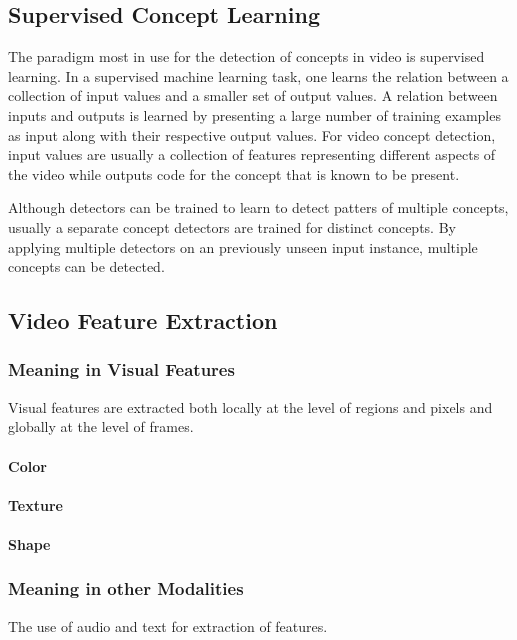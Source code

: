 \subsection{Supervised Concept Learning}

The paradigm most in use for the detection of concepts in video is supervised learning. In a supervised machine learning task, one learns the relation between a collection of input values and a smaller set of output values. A relation between inputs and outputs is learned by presenting a large number of training examples as input along with their respective output values. For video concept detection, input values are usually a collection of features representing different aspects of the video while outputs code for the concept that is known to be present. 

Although detectors can be trained to learn to detect patters of multiple concepts, usually a separate concept detectors are trained for distinct concepts. By applying multiple detectors on an previously unseen input instance, multiple concepts can be detected.

\subsection{Video Feature Extraction}

\subsubsection{Meaning in Visual Features}

Visual features are extracted both locally at the level of regions and pixels and globally at the level of frames.

\paragraph{Color}

\paragraph{Texture}

\paragraph{Shape}

\subsubsection{Meaning in other Modalities}
The use of audio and text for extraction of features.

